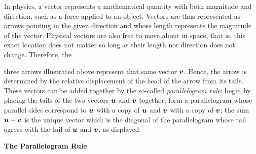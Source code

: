 \begin{Exam}\begin{multicols}{2}
In physics, a vector represents a mathematical quantity with both magnitude and direction, such as a force applied to an object. Vectors are thus represented as arrows pointing in the given direction and whose length represents the magnitude of the vector. Physical vectors are also free to move about in space, that is, this exact location does not matter so long as their length nor direction does not change. Therefore, the\columnbreak

\mbox{}
\begin{center}
\end{center}
\end{multicols}
\vspace{-10 pt} \noindent
 three arrows illustrated above represent that same vector $\boldsymbol v$. Hence, the arrow is determined by the relative displacement of the head of the arrow from its tails. These vectors can be added together by the so-called \emph{parallelogram rule}: begin by placing the tails of the two vectors $\boldsymbol u$ and $\boldsymbol v$ together, form a parallelogram whose parallel sides correspond to $\boldsymbol u$ with a copy of $\boldsymbol u$ and $\boldsymbol v$ with a copy of $\boldsymbol v$; the sum $\boldsymbol u + \boldsymbol v$ is the unique vector which is the diagonal of the parallelogram whose tail agrees with the tail of $\boldsymbol u$ and $\boldsymbol v$, as displayed:

\begin{multicols}{3}
\begin{center}
\vfill \textbf{The Parallelogram Rule}
\end{center}


\end{multicols}
\end{Exam}
